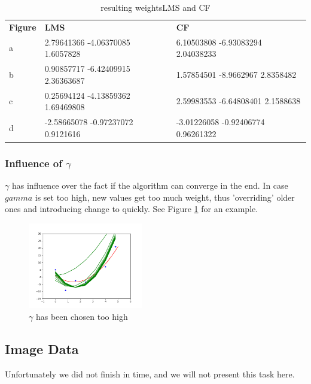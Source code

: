 \begin{table}[]
\begin{tabular}{lll}
\textbf{Figure} & \textbf{LMS} & \textbf{CF} \\
a               &        2.79641366 -4.06370085  1.6057828       &     6.10503808 -6.93083294  2.04038233       \\
b               &      0.90857717 -6.42409915  2.36363687        &     1.57854501 -8.9662967   2.8358482          \\
c               &        0.25694124 -4.13859362  1.69469808      &        2.59983553 -6.64808401  2.1588638         \\
d               &        -2.58665078 -0.97237072  0.9121616       &         -3.01226058 -0.92406774  0.96261322        \\
\end{tabular}
\caption{\label{tab:weights}resulting weights{LMS} and {CF}}
\end{table}


\subsubsection{Influence of $\gamma$ }
 $\gamma$ has influence over the fact if the algorithm can converge in the end. In case $gamma$ is set too high, new values get too much weight, thus 'overriding' older ones and introducing change to quickly. See Figure \ref {fig:gamma} for an example.

\begin{figure}[h]
\begin{center}
\centering
\includegraphics[width=5cm]{fig_gamma.png}
\end{center}
\caption{\label{fig:gamma} $\gamma$ has been chosen too high }
\end{figure}


\newpage
\subsection{Image Data}
Unfortunately we did not finish in time, and we will not present this task here.

